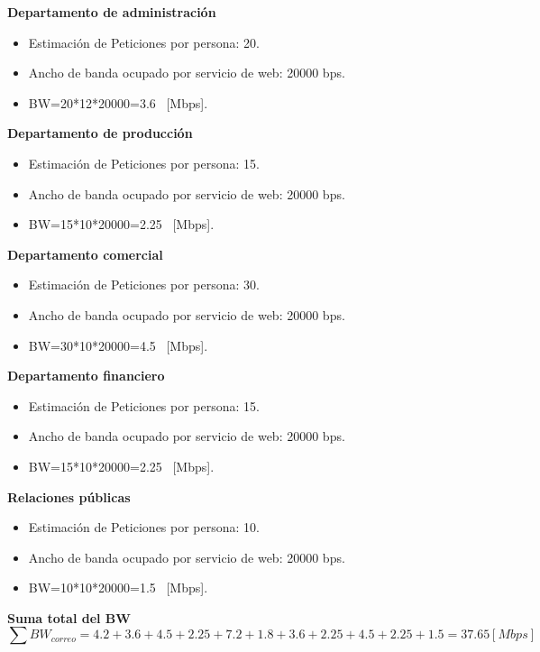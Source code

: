 \documentclass[12pt,letterpaper]{article}
\begin{document}
\textbf{Departamento de administración}
\begin{itemize}
    \item Estimación de Peticiones por persona: 20. 
    \item Ancho de banda ocupado por servicio de web: 20000 bps.
    \item BW=20*12*20000=3.6 \ [Mbps].
\end{itemize}
\textbf{Departamento de producción}
\begin{itemize}
    \item Estimación de Peticiones por persona: 15. 
    \item Ancho de banda ocupado por servicio de web: 20000 bps.
    \item BW=15*10*20000=2.25 \ [Mbps].
\end{itemize}
\textbf{Departamento comercial}
\begin{itemize}
    \item Estimación de Peticiones por persona: 30. 
    \item Ancho de banda ocupado por servicio de web: 20000 bps.
    \item BW=30*10*20000=4.5 \ [Mbps].
\end{itemize}
\textbf{Departamento financiero}
\begin{itemize}
    \item Estimación de Peticiones por persona: 15. 
    \item Ancho de banda ocupado por servicio de web: 20000 bps.
    \item BW=15*10*20000=2.25 \ [Mbps].
\end{itemize}
\textbf{Relaciones públicas}
\begin{itemize}
    \item Estimación de Peticiones por persona: 10. 
    \item Ancho de banda ocupado por servicio de web: 20000 bps.
    \item BW=10*10*20000=1.5 \ [Mbps].
\end{itemize}
\textbf{Suma total del BW}
\begin{equation}
    \sum BW_{correo}=4.2+3.6+4.5+2.25+7.2+1.8+3.6+2.25+4.5+2.25+1.5=37.65[Mbps]
\end{equation}

\newpage
\end{document}
